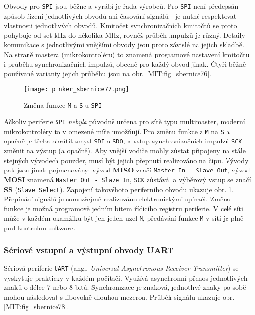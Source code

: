        Obvody pro \texttt{SPI} jsou běžné a vyrábí je řada výrobců. Pro \texttt{SPI} není předepsán
        způsob řízení jednotlivých obvodů ani časování signálů - je nutné respektovat vlastnosti
        jednotlivých obvodů. Kmitočet synchronizačních kmitočtů se proto pohybuje od set kHz do
        několika MHz, rovněž průběh impulzů je různý. Detaily komunikace s jednotlivými vnějšími
        obvody jsou proto závislé na jejich skladbě. Na straně mastera (mikrokontroléru) to znamená
        programové nastavení kmitočtu i průběhu synchronizačních impulzů, obecně pro každý obvod
        jinak. Čtyři běžně používané varianty jejich průběhu jsou na obr. \ref{MIT:fig_sbernice76}.
        
        \begin{figure}[ht!] %
          \centering
          \texttt{[image: pinker\_sbernice77.png]}
          \caption{Změna funkce \texttt{M} a \texttt{S} u \texttt{SPI}}
          \label{MIT:fig_sbernice77}
        \end{figure}

        Ačkoliv periferie \texttt{SPI} \emph{nebyla} původně určena pro sítě typu multimaster,
        moderní mikrokontroléry to v omezené míře umožňují. Pro změnu funkce z \texttt{M} na
        \texttt{S} a opačně je třeba obrátit smysl \texttt{SDI} a \texttt{SDO}, a vstup
        synchronizačních impulzů \texttt{SCK} změnit na výstup (a opačně). Aby vnější vodiče mohly
        zůstat připojeny na stále stejných vývodech pouzder, musí být jejich přepnutí realizováno na
        čipu. Vývody pak jsou jinak pojmenovány: vývod \textbf{MISO} značí \texttt{Master In - Slave
        Out}, vývod \textbf{MOSI} znamená \texttt{Master Out - Slave In}, \texttt{SCK} zůstává, a
        výběrový vstup se značí \textbf{SS} (\texttt{Slave Select}). Zapojení takovéhoto periferního
        obvodu ukazuje obr. \ref{MIT:fig_sbernice77}. Přepínání signálů je samozřejmě realizováno
        elektronickými spínači. Změna funkce je možná programově jedním bitem řídicího registru
        periferie. V celé síti může v každém okamžiku být jen jeden uzel \texttt{M}, předávání
        funkce \texttt{M} v síti je plně pod kontrolou software.
        
      \subsubsection{Sériové vstupní a výstupní obvody UART}
        Sériová periferie \texttt{UART} (angl. \emph{Universal Asynchronous Receiver-Transmitter})
        se vyskytuje prakticky v každém počítači. Využívá asynchronní přenos jednotlivých znaků o
        délce 7 nebo 8 bitů. Synchronizace je znaková, jednotlivé znaky po sobě mohou následovat s
        libovolně dlouhou mezerou. Průběh signálu ukazuje obr. \ref{MIT:fig_sbernice78}.
        
